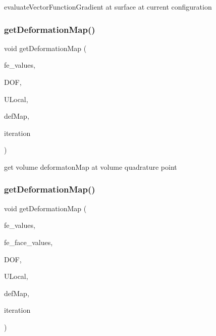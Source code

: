 evaluate\+Vector\+Function\+Gradient at surface at current configuration \mbox{\label{group___evaluation_functions_ga62b026b5bcee0bda21159ff6782b4b59}} 
\subsubsection{\texorpdfstring{getDeformationMap()}{getDeformationMap()}\hspace{0.1cm}{\footnotesize\ttfamily [1/2]}}
{\footnotesize\ttfamily void get\+Deformation\+Map (\begin{DoxyParamCaption}\item[{const F\+E\+Values$<$ dim $>$ \&}]{fe\+\_\+values,  }\item[{unsigned int}]{D\+OF,  }\item[{Table$<$ 1, T $>$ \&}]{U\+Local,  }\item[{\mbox{\hyperlink{structdeformation_map}{deformation\+Map}}$<$ T, dim $>$ \&}]{def\+Map,  }\item[{unsigned int}]{iteration }\end{DoxyParamCaption})}

get volume deformaton\+Map at volume quadrature point \mbox{\label{group___evaluation_functions_ga239b206235603af9482484c29c8d57ea}} 
\subsubsection{\texorpdfstring{getDeformationMap()}{getDeformationMap()}\hspace{0.1cm}{\footnotesize\ttfamily [2/2]}}
{\footnotesize\ttfamily void get\+Deformation\+Map (\begin{DoxyParamCaption}\item[{const F\+E\+Values$<$ dim $>$ \&}]{fe\+\_\+values,  }\item[{const F\+E\+Face\+Values$<$ dim $>$ \&}]{fe\+\_\+face\+\_\+values,  }\item[{unsigned int}]{D\+OF,  }\item[{Table$<$ 1, T $>$ \&}]{U\+Local,  }\item[{\mbox{\hyperlink{structdeformation_map}{deformation\+Map}}$<$ T, dim $>$ \&}]{def\+Map,  }\item[{unsigned int}]{iteration }\end{DoxyParamCaption})}

